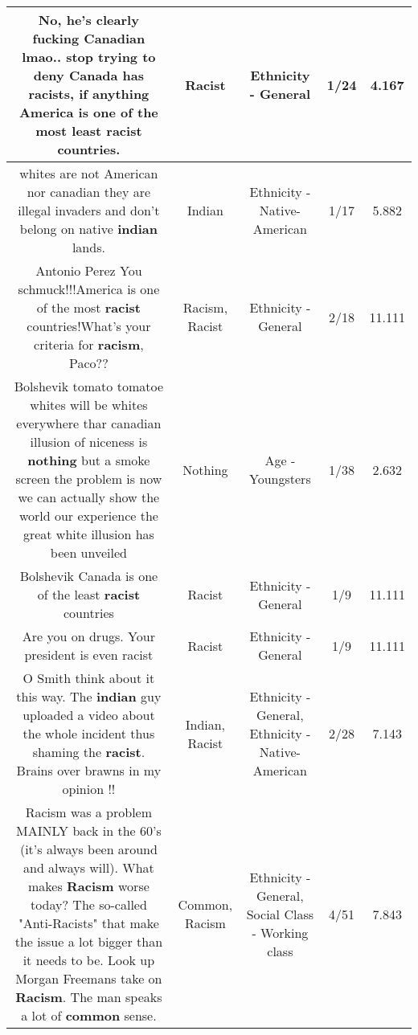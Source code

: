 \documentclass[11pt]{article}
\newlength\mylength
\begin{document}
\begin{center}
\begin{longtable}{|C{.65\mylength}|C{.30\mylength}|C{.12\mylength}|C{.12\mylength}|C{.12\mylength}|}
  \small No, he's clearly fucking Canadian lmao.. stop trying to deny Canada has racists, if anything America is one of the most least \textbf{racist} countries.\normalsize   & Racist & Ethnicity - General & 1/24 & 4.167 \\  \hline
  \small whites are not American nor canadian they are illegal invaders and don't belong on native \textbf{indian} lands.\normalsize   & Indian & Ethnicity - Native-American & 1/17 & 5.882 \\  \hline
  \small Antonio Perez You schmuck!!!America is one of the most \textbf{racist} countries!What's your criteria for \textbf{racism}, Paco??\normalsize   & Racism, Racist & Ethnicity - General & 2/18 & 11.111 \\  \hline
  \small Bolshevik tomato tomatoe whites will be whites everywhere thar canadian illusion of niceness is \textbf{nothing} but a smoke screen the problem is now we can actually show the world our experience the great white illusion has been unveiled\normalsize   & Nothing & Age - Youngsters & 1/38 & 2.632 \\  \hline
  \small Bolshevik Canada is one of the least \textbf{racist} countries\normalsize   & Racist & Ethnicity - General & 1/9 & 11.111 \\  \hline
  \small Are you on drugs. Your president is even racist\normalsize   & Racist & Ethnicity - General & 1/9 & 11.111 \\  \hline
  \small O Smith think about it this way. The \textbf{indian} guy uploaded a video about the whole incident thus shaming the \textbf{racist}. Brains over brawns in my opinion !!\normalsize   & Indian, Racist & Ethnicity - General, Ethnicity - Native-American & 2/28 & 7.143 \\  \hline
  \small Racism was a problem MAINLY back in the 60's (it's always been around and always will). What makes \textbf{Racism} worse today? The so-called "Anti-Racists" that make the issue a lot bigger than it needs to be. Look up Morgan Freemans take on \textbf{Racism}. The man speaks a lot of \textbf{common} sense.\normalsize   & Common, Racism & Ethnicity - General, Social Class - Working class & 4/51 & 7.843 \\  \hline

\end{longtable}
\end{center}
\end{document}
